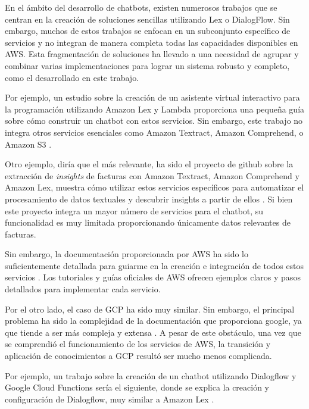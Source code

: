 
En el ámbito del desarrollo de chatbots, existen numerosos trabajos que se centran en la creación de soluciones sencillas utilizando Lex o DialogFlow. Sin embargo, muchos de estos trabajos se enfocan en un subconjunto específico de servicios y no integran de manera completa todas las capacidades disponibles en AWS. Esta fragmentación de soluciones ha llevado a una necesidad de agrupar y combinar varias implementaciones para lograr un sistema robusto y completo, como el desarrollado en este trabajo.

Por ejemplo, un estudio sobre la creación de un asistente virtual interactivo para la programación utilizando Amazon Lex y Lambda proporciona una pequeña guía sobre cómo construir un chatbot con estos servicios. Sin embargo, este trabajo no integra otros servicios esenciales como Amazon Textract, Amazon Comprehend, o Amazon S3 \citep{online:lex_lambda_c}.

Otro ejemplo, diría que el más relevante, ha sido el proyecto de github sobre la extracción de \textit{insights} de facturas con Amazon Textract, Amazon Comprehend y Amazon Lex, muestra cómo utilizar estos servicios específicos para automatizar el procesamiento de datos textuales y descubrir insights a partir de ellos \citep{online:github_textract}. Si bien este proyecto integra un mayor número de servicios para el chatbot, su funcionalidad es muy limitada proporcionando únicamente datos relevantes de facturas.

Sin embargo, la documentación proporcionada por AWS ha sido lo suficientemente detallada para guiarme en la creación e integración de todos estos servicios \citep{online:aws_docs}. Los tutoriales y guías oficiales de AWS ofrecen ejemplos claros y pasos detallados para implementar cada servicio.

Por el otro lado, el caso de GCP ha sido muy similar. Sin embargo, el principal problema ha sido la complejidad de la documentación que proporciona google, ya que tiende a ser más compleja y extensa \citep{online:google_docs}. A pesar de este obstáculo, una vez que se comprendió el funcionamiento de los servicios de AWS, la transición y aplicación de conocimientos a GCP resultó ser mucho menos complicada.

Por ejemplo, un trabajo sobre la creación de un chatbot utilizando Dialogflow y Google Cloud Functions sería el siguiente, donde se explica la creación y configuración de Dialogflow, muy similar a Amazon Lex \citep{online:gcp_chatbot}.